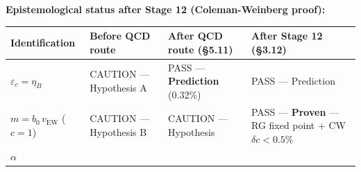 \documentclass[
  11pt,
]{article}
\begin{document}
\textbf{Epistemological status after Stage 12 (Coleman-Weinberg proof):}

\begin{longtable}[]{@{}llll@{}}
\toprule
\begin{minipage}[b]{0.22\columnwidth}\raggedright
Identification\strut
\end{minipage} & \begin{minipage}[b]{0.22\columnwidth}\raggedright
Before QCD route\strut
\end{minipage} & \begin{minipage}[b]{0.22\columnwidth}\raggedright
After QCD route (§5.11)\strut
\end{minipage} & \begin{minipage}[b]{0.22\columnwidth}\raggedright
After Stage 12 (§3.12)\strut
\end{minipage}\tabularnewline
\midrule
\endhead
\begin{minipage}[t]{0.22\columnwidth}\raggedright
\(\varepsilon_c = \eta_B\)\strut
\end{minipage} & \begin{minipage}[t]{0.22\columnwidth}\raggedright
CAUTION --- Hypothesis A\strut
\end{minipage} & \begin{minipage}[t]{0.22\columnwidth}\raggedright
PASS --- \textbf{Prediction} (0.32\%)\strut
\end{minipage} & \begin{minipage}[t]{0.22\columnwidth}\raggedright
PASS --- Prediction\strut
\end{minipage}\tabularnewline
\begin{minipage}[t]{0.22\columnwidth}\raggedright
\(m = b_0\,v_{\text{EW}}\) (\(c = 1\))\strut
\end{minipage} & \begin{minipage}[t]{0.22\columnwidth}\raggedright
CAUTION --- Hypothesis B\strut
\end{minipage} & \begin{minipage}[t]{0.22\columnwidth}\raggedright
CAUTION --- Hypothesis\strut
\end{minipage} & \begin{minipage}[t]{0.22\columnwidth}\raggedright
PASS --- \textbf{Proven} --- RG fixed point + CW
\(\delta c < 0.5\%\)\strut
\end{minipage}\tabularnewline
\begin{minipage}[t]{0.22\columnwidth}\raggedright
\(\alpha\)\strut
\end{minipage} & \begin{minipage}[t]{0.22\columnwidth}\raggedright

\end{minipage}
\end{longtable}
\end{document}
